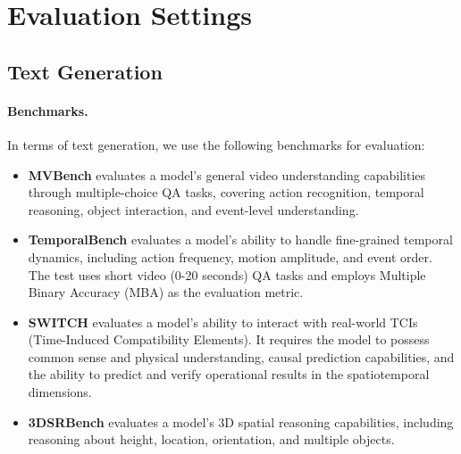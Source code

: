 \section{Evaluation Settings}\label{sec:appendix_evaluation}

\renewcommand{\thefigure}{E\arabic{figure}}
\renewcommand{\theHfigure}{E\arabic{figure}}
\setcounter{figure}{0}

\renewcommand{\thetable}{E\arabic{table}}
\renewcommand{\theHtable}{E\arabic{table}}
\setcounter{table}{0}

\renewcommand{\thelstlisting}{E\arabic{lstlisting}}
\renewcommand{\theHlstlisting}{E\arabic{lstlisting}}
\setcounter{lstlisting}{0}

\subsection{Text Generation}\label{sec:appendix_evaluation_toL}

\paragraph{Benchmarks.} In terms of text generation, we use the following benchmarks for evaluation:

\begin{itemize}
    \item \textbf{MVBench} \citep{MVBench} evaluates a model's general video understanding capabilities through multiple-choice QA tasks, covering action recognition, temporal reasoning, object interaction, and event-level understanding.
    \item \textbf{TemporalBench} \citep{cai2024temporalbench} evaluates a model's ability to handle fine-grained temporal dynamics, including action frequency, motion amplitude, and event order. The test uses short video (0-20 seconds) QA tasks and employs Multiple Binary Accuracy (MBA) as the evaluation metric.
    \item \textbf{SWITCH} \citep{switch2025} evaluates a model's ability to interact with real-world TCIs (Time-Induced Compatibility Elements). It requires the model to possess common sense and physical understanding, causal prediction capabilities, and the ability to predict and verify operational results in the spatiotemporal dimensions.
    \item \textbf{3DSRBench} \citep{ma20253dsrbench} evaluates a model's 3D spatial reasoning capabilities, including reasoning about height, location, orientation, and multiple objects.
\end{itemize}


